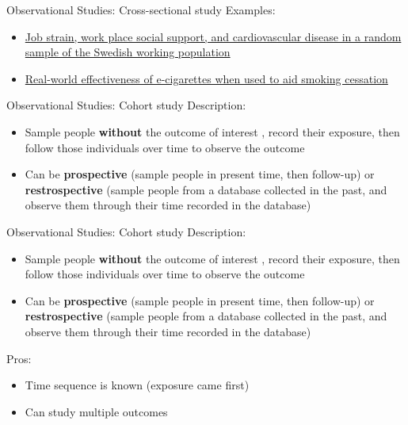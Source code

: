 \documentclass[
  ignorenonframetext,
]{beamer}
\providecommand{\tightlist}{%
  \setlength{\itemsep}{0pt}\setlength{\parskip}{0pt}}
\begin{document}
\begin{frame}{Observational Studies: Cross-sectional study}
\protect\hypertarget{observational-studies-cross-sectional-study-2}{}
Examples:

\begin{itemize}
\tightlist
\item
  \href{http://ajph.aphapublications.org/doi/abs/10.2105/AJPH.78.10.1336}{Job
  strain, work place social support, and cardiovascular disease in a
  random sample of the Swedish working population}
\item
  \href{onlinelibrary.wiley.com/doi/10.1111/add.12623/full}{Real-world
  effectiveness of e-cigarettes when used to aid smoking cessation}
\end{itemize}
\end{frame}

\begin{frame}{Observational Studies: Cohort study}
\protect\hypertarget{observational-studies-cohort-study}{}
Description:

\begin{itemize}
\tightlist
\item
  Sample people \textbf{without} the outcome of interest , record their
  exposure, then follow those individuals over time to observe the
  outcome
\item
  Can be \textbf{prospective} (sample people in present time, then
  follow-up) or \textbf{restrospective} (sample people from a database
  collected in the past, and observe them through their time recorded in
  the database)
\end{itemize}
\end{frame}

\begin{frame}{Observational Studies: Cohort study}
\protect\hypertarget{observational-studies-cohort-study-1}{}
Description:

\begin{itemize}
\tightlist
\item
  Sample people \textbf{without} the outcome of interest , record their
  exposure, then follow those individuals over time to observe the
  outcome
\item
  Can be \textbf{prospective} (sample people in present time, then
  follow-up) or \textbf{restrospective} (sample people from a database
  collected in the past, and observe them through their time recorded in
  the database)
\end{itemize}

Pros:

\begin{itemize}
\tightlist
\item
  Time sequence is known (exposure came first)
\item
  Can study multiple outcomes
\end{itemize}
\end{frame}
\end{document}
